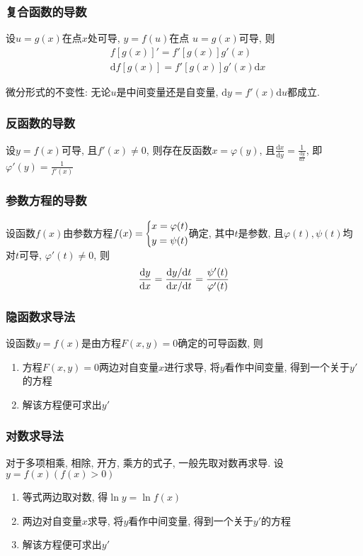 \subsubsection{复合函数的导数}
设$ u=g(x) $在点$ x $处可导, $ y=f(u) $在点 $ u=g(x) $可导, 则
\begin{equation*}
\begin{aligned}
& {f[g(x)]}'=f'[g(x)]g'(x) \\
& \mathrm{d}{f[g(x)]}=f'[g(x)]g'(x)\mathrm{d}x
\end{aligned}
\end{equation*}
\begin{tcolorbox}
微分形式的不变性: 无论$ u $是中间变量还是自变量, $ \mathrm{d}y=f'(x)\mathrm{d}u $都成立.
\end{tcolorbox}
\subsubsection{反函数的导数}
设$ y=f(x) $可导, 且$ f'(x)\neq 0 $, 则存在反函数$ x=\varphi(y) $, 且$ \frac{\mathrm{d}x}{\mathrm{d}y}=\frac{1}{\frac{\mathrm{d}y}{\mathrm{d}x}} $, 即$ \varphi'(y)=\frac{1}{f'(x)} $
\subsubsection{参数方程的导数}
设函数$ f(x) $由参数方程$ f(x)=\scaleleftright[6pt]{\biggl\{}{
\begin{aligned}
& x=\varphi (t) \\
& y=\psi (t)
\end{aligned}
}{.} $确定, 其中$ t $是参数, 且$ \varphi(t), \psi(t) $均对$ t $可导, $ \varphi'(t)\neq 0 $, 则
\begin{equation*}
\dv{y}{x}=\frac{\mathrm{d}y/\mathrm{d}t}{\mathrm{d}x/\mathrm{d}t}=\frac{\psi'(t)}{\varphi'(t)}
\end{equation*}
\subsubsection{隐函数求导法}
设函数$ y=f(x) $是由方程$ F(x,y)=0 $确定的可导函数, 则
\begin{enumerate}
\item 方程$ F(x,y)=0 $两边对自变量$ x $进行求导, 将$ y $看作中间变量, 得到一个关于$ y' $的方程
\item 解该方程便可求出$ y' $
\end{enumerate}
\subsubsection{对数求导法}
对于多项相乘, 相除, 开方, 乘方的式子, 一般先取对数再求导. 设$ y=f(x)(f(x)>0) $
\begin{enumerate}
\item 等式两边取对数, 得$ \ln y=\ln f(x) $
\item 两边对自变量$ x $求导, 将$ y $看作中间变量, 得到一个关于$ y' $的方程
\item 解该方程便可求出$ y' $
\end{enumerate}
